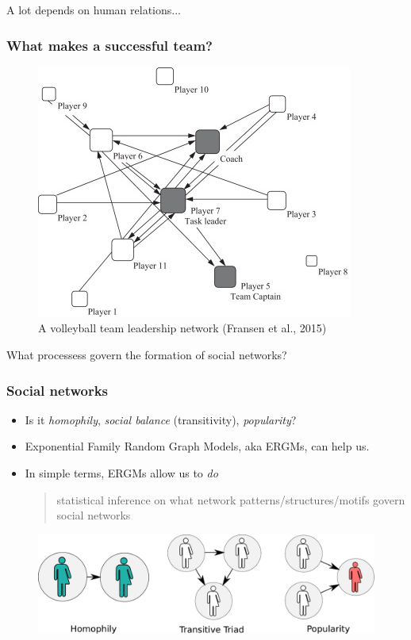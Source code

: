 \documentclass[aspectratio=169, 9pt]{beamer}\usepackage[]{graphicx}\usepackage[]{color}
\begin{document}
\begin{frame}
\normalsize

\pause{}A lot depends on human relations...

\end{frame}

\begin{frame}

\frametitle{What makes a successful team?}

\begin{figure}
\includegraphics[width=.4\linewidth]{volleyball-team.jpg}
\caption{A volleyball team leadership network (Fransen et al., 2015)}
\end{figure}

\pause{} What processess govern the formation of social networks?


\end{frame}


\begin{frame}
\frametitle{Social networks}

\begin{itemize}[<+->]
\item Is it \textit{homophily}, \textit{social balance} (transitivity), \textit{popularity}?
\item Exponential Family Random Graph Models, aka \alert{ERGMs}, can help us.
\item In simple terms, ERGMs allow us to \textit{do}
\begin{quote}
statistical inference on what network patterns/structures/motifs govern social networks
\end{quote}
\end{itemize}

\begin{figure}
\includegraphics[width=.6\linewidth]{friendly-terms.pdf}
\end{figure}

\end{frame}
\end{document}
